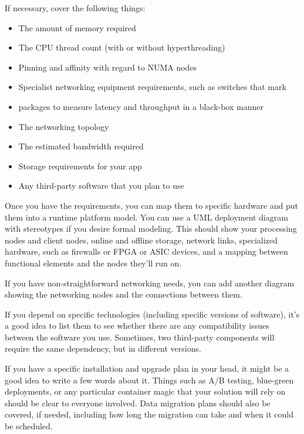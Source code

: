 If necessary, cover the following things:


\begin{itemize}
\item
The amount of memory required

\item 
The CPU thread count (with or without hyperthreading)

\item 
Pinning and affinity with regard to NUMA nodes

\item 
Specialist networking equipment requirements, such as switches that mark

\item 
packages to measure latency and throughput in a black-box manner

\item 
The networking topology

\item 
The estimated bandwidth required

\item 
Storage requirements for your app

\item 
Any third-party software that you plan to use

\end{itemize}

Once you have the requirements, you can map them to specific hardware and put them into a runtime platform model. You can use a UML deployment diagram with stereotypes if you desire formal modeling. This should show your processing nodes and client nodes, online and offline storage, network links, specialized hardware, such as firewalls or FPGA or ASIC devices, and a mapping between functional elements and the nodes they'll run on.

If you have non-straightforward networking needs, you can add another diagram showing the networking nodes and the connections between them. 

If you depend on specific technologies (including specific versions of software), it's a good idea to list them to see whether there are any compatibility issues between the software you use. Sometimes, two third-party components will require the same dependency, but in different versions.

If you have a specific installation and upgrade plan in your head, it might be a good idea to write a few words about it. Things such as A/B testing, blue-green deployments, or any particular container magic that your solution will rely on should be clear to everyone involved. Data migration plans should also be covered, if needed, including how long the migration can take and when it could be scheduled.

